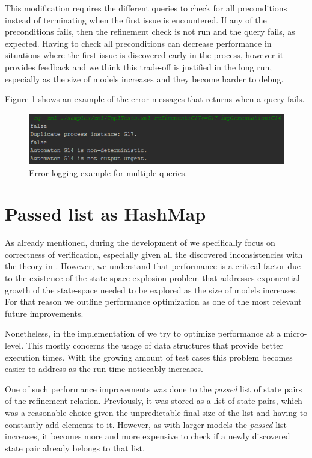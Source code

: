 This modification requires the different queries to check for all preconditions instead of terminating when the first issue is encountered. If any of the preconditions fails, then the refinement check is not run and the query fails, as expected. Having to check all preconditions can decrease performance in situations where the first issue is discovered early in the process, however it provides feedback and we think this trade-off is justified in the long run, especially as the size of models increases and they become harder to debug.

Figure \ref{fig:errLog} shows an example of the error messages that \jecdar returns when a query fails.

\begin{figure}
    \centering
    \includegraphics[scale = 0.7]{figures/ErrorMessages.png}
    \caption{Error logging example for multiple queries.}
    \label{fig:errLog}
\end{figure}

\section{Passed list as HashMap}

As already mentioned, during the development of \jecdar we specifically focus on correctness of verification, especially given all the discovered inconsistencies with the theory in . However, we understand that performance is a critical factor due to the existence of the state-space explosion problem that addresses exponential growth of the state-space needed to be explored as the size of models increases. For that reason we outline performance optimization as one of the most relevant future improvements.

Nonetheless, in the implementation of \jecdar we try to optimize performance at a micro-level. This mostly concerns the usage of data structures that provide better execution times. With the growing amount of test cases this problem becomes easier to address as the run time noticeably increases.

One of such performance improvements was done to the \textit{passed} list of state pairs of the refinement relation. Previously, it was stored as a list of state pairs, which was a reasonable choice given the unpredictable final size of the list and having to constantly add elements to it. However, as with larger models the \textit{passed} list increases, it becomes more and more expensive to check if a newly discovered state pair already belongs to that list.

